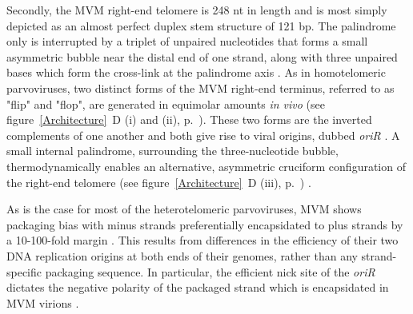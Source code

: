 Secondly, the MVM right-end telomere is 248 nt in length and is most simply depicted as an almost perfect duplex stem structure of 121 bp. The palindrome only is interrupted by a triplet of unpaired nucleotides that forms a small asymmetric bubble near the distal end of one strand, along with three unpaired bases which form the cross-link at the palindrome axis \cite{pmid6298737, pmid3973977}. As in homotelomeric parvoviruses, two distinct forms of the MVM right-end terminus, referred to as "flip" and "flop", are generated in equimolar amounts \textit{in vivo} (see figure~\ref{Architecture}~D (i) and (ii), p.~\pageref{Architecture}). These two forms are the inverted complements of one another and both give rise to viral origins, dubbed \textit{oriR} \cite{pmid1388310, pmid9765384, pmid10627544}. A small internal palindrome, surrounding the three-nucleotide bubble, thermodynamically enables an alternative, asymmetric cruciform configuration of the right-end telomere (see figure~\ref{Architecture}~D (iii), p.~\pageref{Architecture}) \cite{pmid6602687}. 


As is the case for most of the heterotelomeric parvoviruses, MVM shows packaging bias with minus strands preferentially encapsidated to plus strands by a 10-100-fold margin \cite{pmid6828378, pmid3296697}. This results from differences in the efficiency of their two DNA replication origins at both ends of their genomes, rather than any strand-specific packaging sequence. In particular, the efficient nick site of the \textit{oriR} dictates the negative polarity of the packaged strand which is encapsidated in MVM virions \cite{pmid15681430}. 

